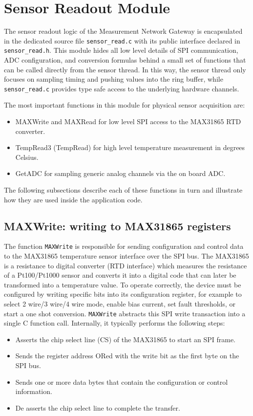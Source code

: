 
\section{Sensor Readout Module}
The sensor readout logic of the Measurement Network Gateway is encapsulated in the dedicated source file \texttt{sensor\_read.c} with its public interface declared in \texttt{sensor\_read.h}. This module hides all low level details of SPI communication, ADC configuration, and conversion formulas behind a small set of functions that can be called directly from the sensor thread. In this way, the sensor thread only focuses on sampling timing and pushing values into the ring buffer, while \texttt{sensor\_read.c} provides type safe access to the underlying hardware channels.

The most important functions in this module for physical sensor acquisition are:
\begin{itemize}
    \item MAXWrite and MAXRead for low level SPI access to the MAX31865 RTD converter.
    \item TempRead3 (TempRead) for high level temperature measurement in degrees Celsius.
    \item GetADC for sampling generic analog channels via the on board ADC.
\end{itemize}

The following subsections describe each of these functions in turn and illustrate how they are used inside the application code.


\subsection{MAXWrite: writing to MAX31865 registers}
The function \texttt{MAXWrite} is responsible for sending configuration and control data to the MAX31865 temperature sensor interface over the SPI bus. The MAX31865 is a resistance to digital converter (RTD interface) which measures the resistance of a Pt100/Pt1000 sensor and converts it into a digital code that can later be transformed into a temperature value. To operate correctly, the device must be configured by writing specific bits into its configuration register, for example to select 2 wire/3 wire/4 wire mode, enable bias current, set fault thresholds, or start a one shot conversion.
\texttt{MAXWrite} abstracts this SPI write transaction into a single C function call. Internally, it typically performs the following steps:
\begin{itemize}
    \item Asserts the chip select line (CS) of the MAX31865 to start an SPI frame.
    \item Sends the register address ORed with the write bit as the first byte on the SPI bus.
    \item Sends one or more data bytes that contain the configuration or control information.
    \item De asserts the chip select line to complete the transfer.
\end{itemize}

